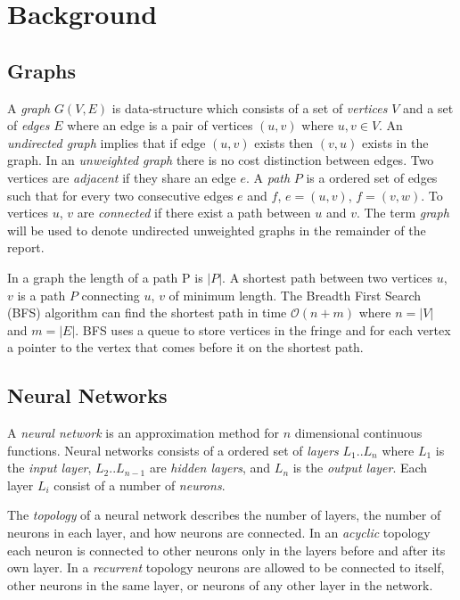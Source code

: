 
\section{Background}
\subsection{Graphs}
A \textit{graph} $G(V,E)$ is data-structure which consists of a set of \textit{vertices} $V$ and a set of \textit{edges} $E$ where an edge is a pair of vertices $(u,v) $ where $u,v\in V$. An \textit{undirected graph} implies that if edge $ (u,v) $ exists then $ (v,u)$ exists in the graph. In an \textit{unweighted graph} there is no cost distinction between edges.
Two vertices are \textit{adjacent} if they share an edge $ e $. A \textit{path} $ P $ is a ordered set of edges such that for every two consecutive edges $ e $ and $ f $, $ e=(u,v) $, $ f=(v,w) $. To vertices $ u $, $ v $ are \textit{connected} if there exist a path between $ u $ and $ v $. The term \textit{graph} will be used to denote undirected unweighted graphs in the remainder of the report.

\newpar In a graph the length of a path P is $|P|$. A shortest path between two vertices  $u$, $v$ is a path $P$ connecting  $u$, $v$ of minimum length. The Breadth First Search (BFS) algorithm can find the shortest path in time $\mathcal{O}(n+m)$ where $n=|V|$ and $m=|E|$. BFS uses a queue to store vertices in the fringe and for each vertex a pointer to the vertex that comes before it on the shortest path.

\subsection{Neural Networks}
A \textit{neural network} is an approximation method for $ n $ dimensional continuous functions. Neural networks consists of a ordered set of \textit{layers} $L_1 .. L_n$ where $L_1$ is the \textit{input layer}, $L_2 .. L_{n-1}$ are \textit{hidden layers}, and $L_n$ is the \textit{output layer}. Each layer $L_i$ consist of a number of \textit{neurons}. 

\newpar The \textit{topology} of a neural network describes the number of layers, the number of neurons in each layer, and how neurons are connected. In an \textit{acyclic} topology each neuron is connected to other neurons only in the layers before and after its own layer. In a \textit{recurrent} topology neurons are allowed to be connected to itself, other neurons in the same layer, or neurons of any other layer in the network.

